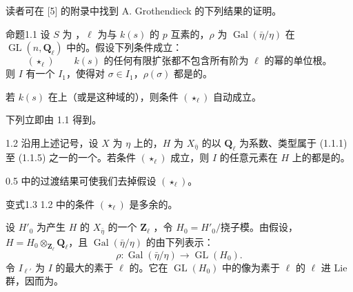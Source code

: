 读者可在 [5] 的附录中找到 A. Grothendieck 的下列结果的证明。
\begin{SGAresult}{命题}{1.1}
设 $S$ 为 ，$\ell$ 为与 $k(s)$ 的 $p$ 互素的，$\rho$ 为 $\operatorname{Gal}(\bar\eta/\eta)$ 在 $\operatorname{GL}(n,\mathbf Q_\ell)$ 中的。假设下列条件成立：
\[
(\star_\ell)\qquad
\text{$k(s)$ 的任何有限扩张都不包含所有阶为 $\ell$ 的幂的单位根。}
\]
则 $I$ 有一个 $I_1$，使得对 $\sigma\in I_1$，$\rho(\sigma)$ 都是的。
\end{SGAresult}
若 $k(s)$ 在上（或是这种域的），则条件 $(\star_\ell)$ 自动成立。

下列立即由 1.1 得到。
\begin{SGAresult}{}{1.2}
沿用上述记号，设 $X$ 为 $\eta$ 上的，$H$ 为 $X_{\bar\eta}$ 的以 $\mathbf Q_\ell$ 为系数、类型属于 (1.1.1) 至 (1.1.5) 之一的一个。若条件 $(\star_\ell)$ 成立，则 $I$ 的任意元素在 $H$ 上的都是的。
\end{SGAresult}
0.5 中的过渡结果可使我们去掉假设 $(\star_\ell)$。
\begin{SGAresult}{变式}{1.3}
1.2 中的条件 $(\star_\ell)$ 是多余的。
\end{SGAresult}
设 $H'_0$ 为产生 $H$ 的 $X_{\bar\eta}$ 的一个 $\mathbf Z_\ell$ ，令 $H_0=H'_0/\text{挠子模}$。由假设，$H=H_0\otimes_{\mathbf Z_\ell}\mathbf Q_\ell$，且 $\operatorname{Gal}(\bar\eta/\eta)$ 的由下列表示：
\[
\rho:\operatorname{Gal}(\bar\eta/\eta)\longrightarrow\operatorname{GL}(H_0).
\]
令 $I_{\ell'}$ 为 $I$ 的最大的素于 $\ell$ 的。它在 $\operatorname{GL}(H_0)$ 中的像为素于 $\ell$ 的 $\ell$ 进 Lie 群，因而为。

